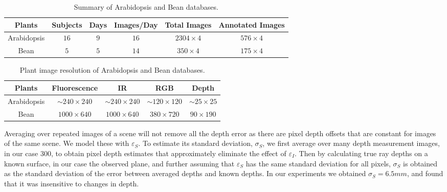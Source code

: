 \begin{table*}[t!]
\begin{center}
\caption{Summary of Arabidopsis and Bean databases.}
\label{tab:stat}
\begin{tabular}{c|c|c|c|c|c}
\hline
Plants & Subjects & Days & Images/Day & Total Images & Annotated Images \\
\hline
Arabidopsis & $16$ & $9$ & $16$ & $2304\times 4$ & $576\times 4$ \\
\hline
Bean & $5$ & $5$ & $14$ & $350\times 4$ & $175\times 4$ \\
\hline
\end{tabular}
\end{center}
\end{table*}



\begin{table*}
\begin{center}
\caption{Plant image resolution of Arabidopsis and Bean databases.}
\label{tab:resolution}
\begin{tabular}{c|c|c|c|c}
\hline
Plants & Fluorescence & IR & RGB & Depth \\
\hline
Arabidopsis & $\sim$$240\times240$ & $\sim$$240\times240$ & $\sim$$120\times120$ & $\sim$$25\times25$ \\
Bean & $1000\times640$ & $1000\times640$ & $380\times720$ & $90\times190$ \\
\hline
\end{tabular}
\end{center}
\end{table*}

Averaging over repeated images of a scene will not remove all the depth error as there are pixel depth offsets that are constant for images of the same scene. We model these with $\varepsilon_S$. To estimate its standard deviation, $\sigma_S$, we first average over many depth measurement images, in our case 300, to obtain pixel depth estimates that approximately eliminate the effect of $\varepsilon_I$. Then by calculating true ray depths on a known surface, in our case the observed plane, and further assuming that $\varepsilon_S$ has the same standard deviation for all pixels, $\sigma_S$ is obtained as the standard deviation of the error between averaged depths and known depths. In our experiments we obtained $\sigma_S=6.5mm$, and found that it was insensitive to changes in depth.

